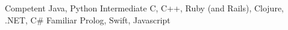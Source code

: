 \begin{cvskills}
  \cvskill
    {Competent}
    {Java, Python}
   \cvskill
    {Intermediate}
    {C, C++, Ruby (and Rails), Clojure, .NET, C\#}
   \cvskill
    {Familiar}
    {Prolog, Swift, Javascript}
\end{cvskills}